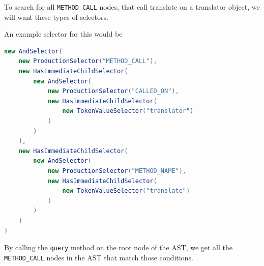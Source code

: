 To search for all \verb|METHOD_CALL| nodes, that call translate on a translator object, we will want these types of selectors.

An example selector for this would be

\begin{lstlisting}[language=Java, caption=Selector example]
new AndSelector(
	new ProductionSelector("METHOD_CALL"),
	new HasImmediateChildSelector(
		new AndSelector(
			new ProductionSelector("CALLED_ON"),
			new HasImmediateChildSelector(
				new TokenValueSelector("translator")
			)
		)
	),
	new HasImmediateChildSelector(
		new AndSelector(
			new ProductionSelector("METHOD_NAME"),
			new HasImmediateChildSelector(
				new TokenValueSelector("translate")
			)
		)
	)
)
\end{lstlisting}

By calling the \verb|query| method on the root node of the AST, we get all the \verb|METHOD_CALL| nodes in the AST that match those conditions.
